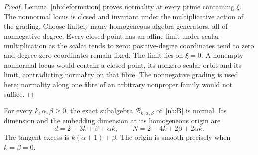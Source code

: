 \begin{proof}
Lemma~\ref{nb:deformation} proves normality at every prime containing
$\xi$. The nonnormal locus is closed and invariant under the
multiplicative action of the grading. Choose finitely many homogeneous
algebra generators, all of nonnegative degree. Every closed point
has an affine limit under scalar multiplication as the scalar tends
to zero: positive-degree coordinates tend to zero and degree-zero
coordinates remain fixed. The limit lies on $\xi=0$. A nonempty
nonnormal locus would contain a closed point, its nonzero-scalar
orbit and its limit, contradicting normality on that fibre. The
nonnegative grading is used here; normality along one fibre of an
arbitrary nonproper family would not suffice.
\end{proof}

\begin{proposition}\label{nb:star}
For every $k,\alpha,\beta\geq0$, the exact subalgebra
$\mathcal B_{k,\alpha,\beta}$ of~\eqref{nb:B} is normal. Its
dimension and the embedding dimension at its homogeneous origin are
\[
 d=2+3k+\beta+\alpha k,\qquad
 N=2+4k+2\beta+2\alpha k.
\]
The tangent excess is $k(\alpha+1)+\beta$. The origin is smooth
precisely when $k=\beta=0$.
\end{proposition}

